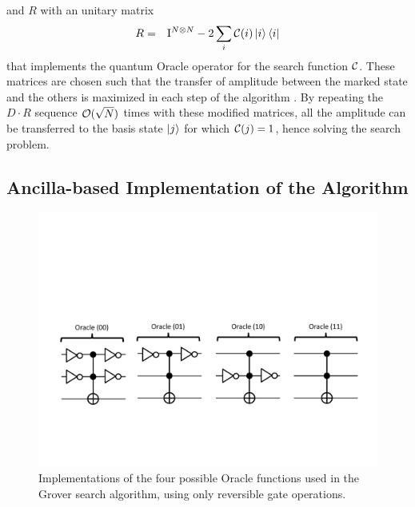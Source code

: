 and $R$ with an unitary matrix 
\begin{eqnarray}
R & = & \mathrm{I}^{N\otimes N}-2\sum\limits_{i}\Or(i)\ket{i}\bra{i} \label{eq:GroverOracleFunction}
\end{eqnarray}
that implements the quantum Oracle operator for the search function $\Or$. These matrices are chosen such that the transfer of amplitude between the marked state and the others is maximized in each step of the algorithm . By repeating the $D\cdot R$ sequence $\begin{mathcal}O\end{mathcal}(\sqrt{N})$ times with these modified matrices, all the amplitude can be transferred to the basis state $\left| j \right>$ for which $\Or(j)=1$, hence solving the search problem.

\subsection{Ancilla-based Implementation of the Algorithm}

\begin{figure}[ht!]
	\centering
		\includegraphics[width=1\textwidth]{./material/papers/grover/different_oracle_implementations}
	\caption[Implementations of the four possible Oracle functions used in the Grover search algorithm, using only reversible gate operations]{Implementations of the four possible Oracle functions used in the Grover search algorithm, using only reversible gate operations.}
	\label{fig:GroverOracleImplementations}
\end{figure}

